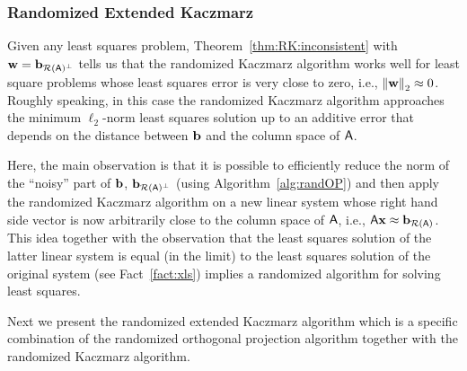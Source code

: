 \subsubsection*{Randomized Extended Kaczmarz}
%
%
Given any least squares problem, Theorem~\ref{thm:RK:inconsistent} with ${\mathbf{w}} = {{\mathbf b}_{\mathcal{R}({\mathsf{A} })^\bot } }$ tells us that the randomized Kaczmarz algorithm works well for least square problems whose least squares error is very close to zero, i.e., $\left\|{\mathbf{w}}\right\|_2\approx 0$. Roughly speaking, in this case the randomized Kaczmarz algorithm approaches the minimum $\ell_2$-norm least squares solution up to an additive error that depends on the distance between ${\mathbf b}$ and the column space of ${\mathsf{A} }$.

Here, the main observation is that it is possible to efficiently reduce the norm of the ``noisy'' part of ${\mathbf b}$, ${{\mathbf b}_{\mathcal{R}({\mathsf{A} })^\bot } }$ (using Algorithm~\ref{alg:randOP}) and then apply the randomized Kaczmarz algorithm on a new linear system whose right hand side vector is now arbitrarily close to the column space of ${\mathsf{A} }$, i.e., ${\mathsf{A} }\mathbf{x}\approx {{\mathbf b}_{\mathcal{R}( {\ensuremath{\mathsf{A} }}) } }$. This idea together with the observation that the least squares solution of the latter linear system is equal (in the limit) to the least squares solution of the original system (see Fact~\ref{fact:xls}) implies a randomized algorithm for solving least squares.

Next we present the randomized extended Kaczmarz algorithm which is a specific combination of the randomized orthogonal projection algorithm together with the randomized Kaczmarz algorithm.
%
